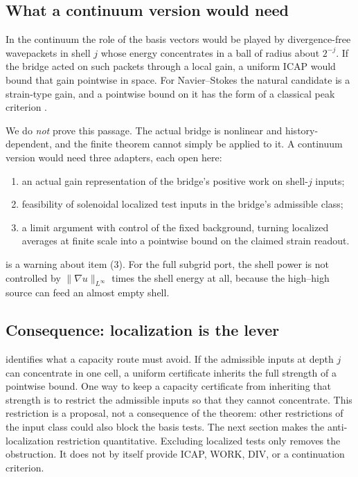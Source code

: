 \subsection{What a continuum version would need}

In the continuum the role of the basis vectors would be played by divergence-free wavepackets in
shell $j$ whose energy concentrates in a ball of radius about $2^{-j}$. If the bridge acted on
such packets through a local gain, a uniform ICAP would bound that gain pointwise in space. For
Navier--Stokes the natural candidate is a strain-type gain, and a pointwise bound on it has the
form of a classical peak criterion \citep{majda_bertozzi_vif,bkm_1984,serrin1962interior}.

We do \emph{not} prove this passage. The actual bridge is nonlinear and history-dependent, and the
finite theorem cannot simply be applied to it. A continuum version would need three adapters,
each open here:
\begin{enumerate}
\item an actual gain representation of the bridge's positive work on shell-$j$ inputs;
\item feasibility of solenoidal localized test inputs in the bridge's admissible class;
\item a limit argument with control of the fixed background, turning localized averages at finite
scale into a pointwise bound on the claimed strain readout.
\end{enumerate}
 is a warning about item (3). For the full subgrid port, the shell
power is not controlled by $\|\nabla u\|_{L^\infty}$ times the shell energy at all, because the
high--high source can feed an almost empty shell.

\subsection{Consequence: localization is the lever}

 identifies what a capacity route must avoid. If the admissible inputs at
depth $j$ can concentrate in one cell, a uniform certificate inherits the full strength of a
pointwise bound. One way to keep a capacity certificate from inheriting that strength is to
restrict the admissible inputs so that they cannot concentrate. This restriction is a proposal,
not a consequence of the theorem: other restrictions of the input class could also block the
basis tests. The next section makes the anti-localization restriction quantitative. Excluding localized tests only removes the obstruction. It
does not by itself provide ICAP, WORK, DIV, or a continuation criterion.
